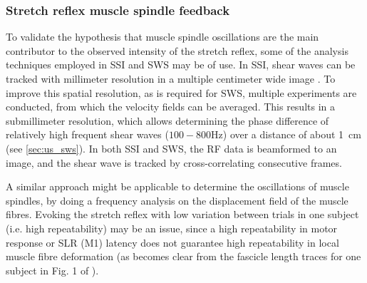 


\subsubsection{Stretch reflex muscle spindle feedback}


To validate the hypothesis that muscle spindle oscillations are the main contributor to the observed intensity of the stretch reflex, some of the analysis techniques employed in SSI and SWS may be of use. In SSI, shear waves can be tracked with millimeter resolution in a multiple centimeter wide image \cite{deffieux_shear_2009}. To improve this spatial resolution, as is required for SWS, multiple experiments are conducted, from which the velocity fields can be averaged. This results in a submillimeter resolution, which allows determining the phase difference of relatively high frequent shear waves ($100-800$\si{\hertz}) over a distance of about \SI{1}{\centi\meter} (see \autoref{sec:us_sws}). In both SSI and SWS, the RF data is beamformed to an image, and the shear wave is tracked by cross-correlating consecutive frames. 

A similar approach might be applicable to determine the oscillations of muscle spindles, by doing a frequency analysis on the displacement field of the muscle fibres. Evoking the stretch reflex with low variation between trials in one subject (i.e. high repeatability) may be an issue, since a high repeatability in motor response or SLR (M1) latency does not guarantee high repeatability in local muscle fibre deformation (as becomes clear from the fascicle length traces for one subject in Fig. 1 of \cite{cronin_triceps_2015}). 


